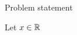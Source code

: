 \documentclass{article}
\begin{document}
\makehwtitle

\begin{problem}
    Problem statement
\end{problem}

\begin{solution}
    Let $x \in \mathbb{R}$
\end{solution}
\begin{problem}
    
\end{problem}
\end{document}
